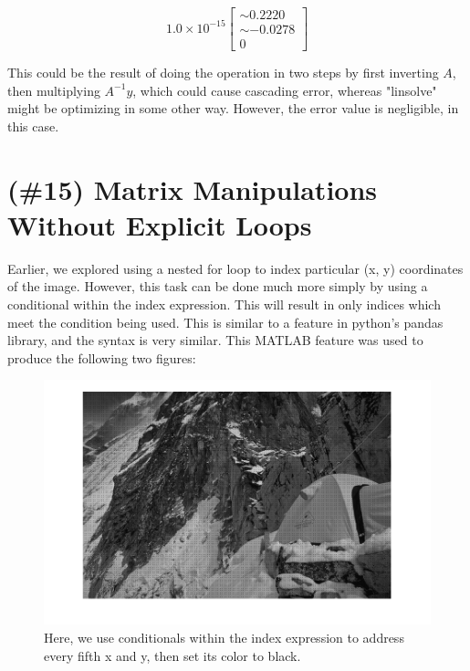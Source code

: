 \documentclass{article}
\begin{document}
$$
1.0 \times 10^{-15}
\begin{bmatrix}
\sim 0.2220 \\
\sim -0.0278 \\
0
\end{bmatrix}
$$

This could be the result of doing the operation in two steps by first inverting 
$A$, then multiplying $A^{-1} y$, which could cause cascading error, whereas
 "linsolve" might be optimizing in 
some other way. However, the error value is negligible, in this case.

\section{(\#15) Matrix Manipulations Without Explicit Loops}

Earlier, we explored using a nested for loop to index particular (x, y) 
coordinates of the image. However, this task can be done much more simply by 
using a conditional within the index expression. This will result in only 
indices which meet the condition being used. This is similar to a feature in 
python's pandas library, and the syntax is very similar. This MATLAB feature was 
used to produce the following two figures:

\begin{figure}[!ht]
	\centering
	\includegraphics[width=120mm]{figs/tent_black_dots.png}
	\caption{Here, we use conditionals within the index expression to address 
        every fifth x and y, then set its color to black.}
\end{figure}
\end{document}
